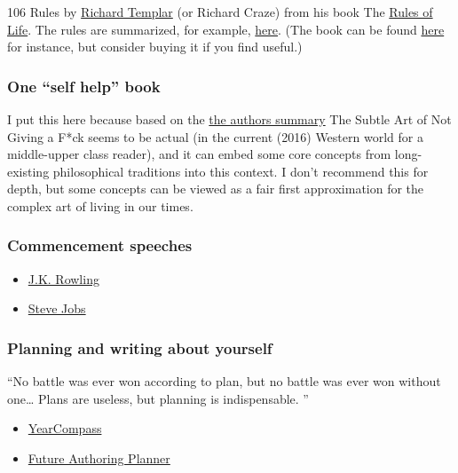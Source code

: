 \documentclass{article}
\begin{document}
106 Rules by \href{https://en.wikipedia.org/wiki/Richard_Templar}{Richard Templar} (or Richard Craze) from his book The \href{https://www.goodreads.com/book/show/232088.The_Rules_of_Life}{Rules of Life}. The rules are summarized, for example, \href{https://www.goodreads.com/review/show/279719880}{here}. (The book can be found \href{https://web.archive.org/web/20160109092638/http://albaab.free.fr/The\%20Rules\%20of\%20Life.pdf}{here} for instance, but consider buying it if you find useful.)

\subsubsection{One ``self help'' book}

I put this here because based on the \href{https://www.youtube.com/watch?v=lz8sUiXAnbs}{the authors summary} The Subtle Art of Not Giving a F*ck seems to be actual (in the current (2016) Western world for a middle-upper class reader), and it can embed some core concepts from long-existing philosophical traditions into this context.
I don't recommend this for depth, but some concepts can be viewed as a fair first approximation for the complex art of living in our times.


\subsubsection{Commencement speeches}

\begin{itemize}
    \item \href{https://www.youtube.com/watch?v=UibfDUPJAEU}{J.K. Rowling}
    \item \href{https://www.youtube.com/watch?v=UF8uR6Z6KLc}{Steve Jobs} 
\end{itemize}




\subsubsection{Planning and writing about yourself}


\vspace{1cm}
{``No battle was ever won according to plan, but no battle was ever won without one… Plans are useless, but planning is indispensable. ''
\\[5pt]
}


\begin{itemize}
    \item \href{https://yearcompass.com/}{YearCompass}
    \item \href{http://web.archive.org/web/20210202023126/https://thecharacterarc.com/wp-content/uploads/2019/01/Future-Authoring-Planner-by-The-Character-Arc.pdf}{Future Authoring Planner}
\end{itemize}
\end{document}
